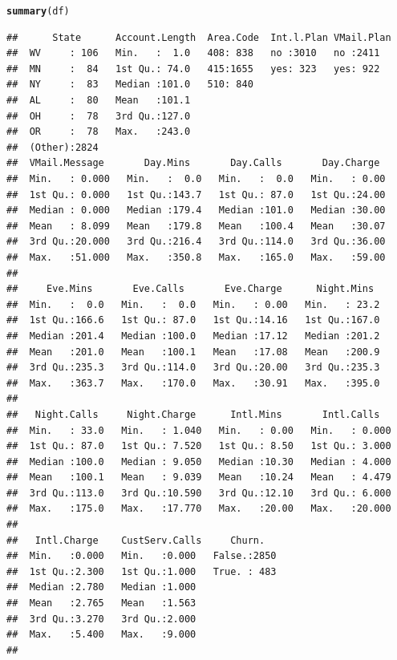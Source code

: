 \documentclass{article}\usepackage[]{graphicx}\usepackage[]{color}
\makeatletter
\newcommand{\hlstd}[1]{\textcolor[rgb]{0.345,0.345,0.345}{#1}}%
\newcommand{\hlkwd}[1]{\textcolor[rgb]{0.737,0.353,0.396}{\textbf{#1}}}%
\newenvironment{kframe}{%
 \def\at@end@of@kframe{}%
 \ifinner\ifhmode%
  \def\at@end@of@kframe{\end{minipage}}%
  \begin{minipage}{\columnwidth}%
 \fi\fi%
 \def\FrameCommand##1{\hskip\@totalleftmargin \hskip-\fboxsep
 \colorbox{shadecolor}{##1}\hskip-\fboxsep
     \hskip-\linewidth \hskip-\@totalleftmargin \hskip\columnwidth}%
 \MakeFramed {\advance\hsize-\width
   \@totalleftmargin\z@ \linewidth\hsize
   \@setminipage}}%
 {\par\unskip\endMakeFramed%
 \at@end@of@kframe}
\newenvironment{knitrout}{}{} %
\makeatother
\begin{document}
\begin{knitrout}
\color{fgcolor}\begin{kframe}
\begin{alltt}
\hlkwd{summary}\hlstd{(df)}
\end{alltt}
\begin{verbatim}
##      State      Account.Length  Area.Code  Int.l.Plan VMail.Plan
##  WV     : 106   Min.   :  1.0   408: 838   no :3010   no :2411  
##  MN     :  84   1st Qu.: 74.0   415:1655   yes: 323   yes: 922  
##  NY     :  83   Median :101.0   510: 840                        
##  AL     :  80   Mean   :101.1                                   
##  OH     :  78   3rd Qu.:127.0                                   
##  OR     :  78   Max.   :243.0                                   
##  (Other):2824                                                   
##  VMail.Message       Day.Mins       Day.Calls       Day.Charge   
##  Min.   : 0.000   Min.   :  0.0   Min.   :  0.0   Min.   : 0.00  
##  1st Qu.: 0.000   1st Qu.:143.7   1st Qu.: 87.0   1st Qu.:24.00  
##  Median : 0.000   Median :179.4   Median :101.0   Median :30.00  
##  Mean   : 8.099   Mean   :179.8   Mean   :100.4   Mean   :30.07  
##  3rd Qu.:20.000   3rd Qu.:216.4   3rd Qu.:114.0   3rd Qu.:36.00  
##  Max.   :51.000   Max.   :350.8   Max.   :165.0   Max.   :59.00  
##                                                                  
##     Eve.Mins       Eve.Calls       Eve.Charge      Night.Mins   
##  Min.   :  0.0   Min.   :  0.0   Min.   : 0.00   Min.   : 23.2  
##  1st Qu.:166.6   1st Qu.: 87.0   1st Qu.:14.16   1st Qu.:167.0  
##  Median :201.4   Median :100.0   Median :17.12   Median :201.2  
##  Mean   :201.0   Mean   :100.1   Mean   :17.08   Mean   :200.9  
##  3rd Qu.:235.3   3rd Qu.:114.0   3rd Qu.:20.00   3rd Qu.:235.3  
##  Max.   :363.7   Max.   :170.0   Max.   :30.91   Max.   :395.0  
##                                                                 
##   Night.Calls     Night.Charge      Intl.Mins       Intl.Calls    
##  Min.   : 33.0   Min.   : 1.040   Min.   : 0.00   Min.   : 0.000  
##  1st Qu.: 87.0   1st Qu.: 7.520   1st Qu.: 8.50   1st Qu.: 3.000  
##  Median :100.0   Median : 9.050   Median :10.30   Median : 4.000  
##  Mean   :100.1   Mean   : 9.039   Mean   :10.24   Mean   : 4.479  
##  3rd Qu.:113.0   3rd Qu.:10.590   3rd Qu.:12.10   3rd Qu.: 6.000  
##  Max.   :175.0   Max.   :17.770   Max.   :20.00   Max.   :20.000  
##                                                                   
##   Intl.Charge    CustServ.Calls     Churn.    
##  Min.   :0.000   Min.   :0.000   False.:2850  
##  1st Qu.:2.300   1st Qu.:1.000   True. : 483  
##  Median :2.780   Median :1.000                
##  Mean   :2.765   Mean   :1.563                
##  3rd Qu.:3.270   3rd Qu.:2.000                
##  Max.   :5.400   Max.   :9.000                
## 
\end{verbatim}
\end{kframe}
\end{knitrout}
\end{document}

